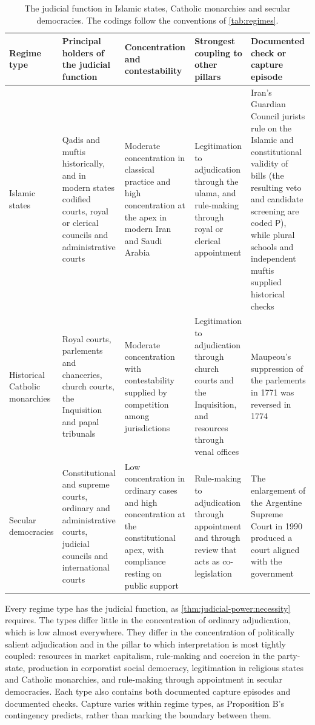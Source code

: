 \documentclass[11pt,letterpaper]{article}
\theoremstyle{definition}
\theoremstyle{remark}
\newcommand{\pP}{\mathsf{P}}
\begin{document}
\begin{table}[!htb]
\centering
\small
\caption{The judicial function in Islamic states, Catholic monarchies and secular democracies. The codings follow the conventions of \cref{tab:regimes}.}
\label{tab:regimes2}
\begin{tabularx}{\textwidth}{L{2.2cm}YYYY}
\toprule
Regime type & Principal holders of the judicial function & Concentration and contestability & Strongest coupling to other pillars & Documented check or capture episode \\
\midrule
Islamic states & Qadis and muftis historically, and in modern states codified courts, royal or clerical councils and administrative courts & Moderate concentration in classical practice and high concentration at the apex in modern Iran and Saudi Arabia & Legitimation to adjudication through the ulama, and rule-making through royal or clerical appointment & Iran's Guardian Council jurists rule on the Islamic and constitutional validity of bills (the resulting veto and candidate screening are coded $\pP$), while plural schools and independent muftis supplied historical checks \\
\addlinespace
Historical Catholic monarchies & Royal courts, parlements and chanceries, church courts, the Inquisition and papal tribunals & Moderate concentration with contestability supplied by competition among jurisdictions & Legitimation to adjudication through church courts and the Inquisition, and resources through venal offices & Maupeou's suppression of the parlements in 1771 was reversed in 1774 \\
\addlinespace
Secular democracies & Constitutional and supreme courts, ordinary and administrative courts, judicial councils and international courts & Low concentration in ordinary cases and high concentration at the constitutional apex, with compliance resting on public support & Rule-making to adjudication through appointment and through review that acts as co-legislation & The enlargement of the Argentine Supreme Court in 1990 produced a court aligned with the government \\
\bottomrule
\end{tabularx}
\end{table}

Every regime type has the judicial function, as \cref{thm:judicial-power:necessity} requires. The types differ little in the concentration of ordinary adjudication, which is low almost everywhere. They differ in the concentration of politically salient adjudication and in the pillar to which interpretation is most tightly coupled: resources in market capitalism, rule-making and coercion in the party-state, production in corporatist social democracy, legitimation in religious states and Catholic monarchies, and rule-making through appointment in secular democracies. Each type also contains both documented capture episodes and documented checks. Capture varies within regime types, as Proposition B's contingency predicts, rather than marking the boundary between them.
\end{document}
